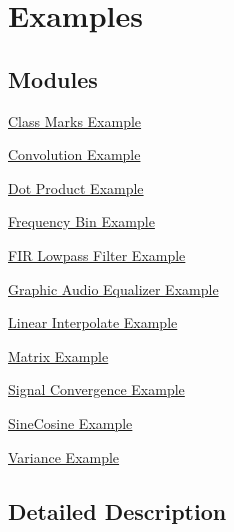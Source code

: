 \hypertarget{group__group_examples}{\section{Examples}
\label{group__group_examples}
}
\subsection*{Modules}
\begin{DoxyCompactItemize}
\item 
\hyperlink{group___class_marks}{Class Marks Example}
\item 
\hyperlink{group___convolution_example}{Convolution Example}
\item 
\hyperlink{group___dotproduct_example}{Dot Product Example}
\item 
\hyperlink{group___frequency_bin}{Frequency Bin Example}
\item 
\hyperlink{group___f_i_r_l_p_f}{F\-I\-R Lowpass Filter Example}
\item 
\hyperlink{group___g_e_q5_band}{Graphic Audio Equalizer Example}
\item 
\hyperlink{group___linear_interp_example}{Linear Interpolate Example}
\item 
\hyperlink{group___matrix_example}{Matrix Example}
\item 
\hyperlink{group___signal_convergence}{Signal Convergence Example}
\item 
\hyperlink{group___sin_cos_example}{Sine\-Cosine Example}
\item 
\hyperlink{group___variance_example}{Variance Example}
\end{DoxyCompactItemize}


\subsection{Detailed Description}
